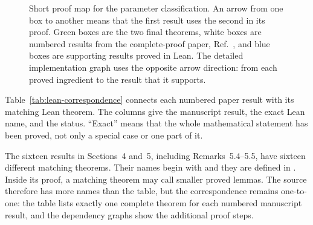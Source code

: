 \documentclass[aps,pra,11pt,onecolumn,nofootinbib,tightenlines]{revtex4-2}
\newcommand{\LeanDecl}[1]{\path{#1}}
\begin{document}
\begin{figure}[htbp]
\caption{Short proof map for the parameter classification. An arrow from one
box to another means that the first result uses the second in its proof. Green
boxes are the two final theorems, white boxes are numbered results from the
complete-proof paper, Ref.~\cite{rubboli2026parametersFull}, and blue boxes are
supporting results proved in Lean. The detailed implementation graph uses the
opposite arrow direction: from each proved ingredient to the result that it
supports.}
\label{fig:lean-dependencies}
\end{figure}

Table~\ref{tab:lean-correspondence} connects each numbered paper result with
its matching Lean theorem. The columns give the manuscript result, the exact
Lean name, and the status. ``Exact'' means that the whole mathematical
statement has been proved, not only a special case or one part of it.

The sixteen results in Sections~4 and~5, including Remarks~5.4--5.5, have
sixteen different matching theorems. Their names begin with
\LeanDecl{ConditionalEntropy} and they are defined in
. Inside its proof, a
matching theorem may call smaller proved lemmas. The source therefore has more
names than the table, but the correspondence remains one-to-one: the table
lists exactly one complete theorem for each numbered manuscript result, and
the dependency graphs show the additional proof steps.
\end{document}
